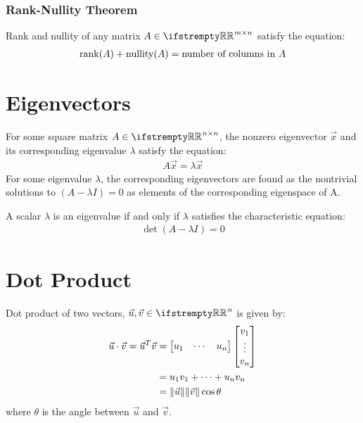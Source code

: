 \documentclass[12pt, a4paper]{article}
\begin{document}
\begin{multicols*}{3}
\subsubsection{Rank-Nullity Theorem}
Rank and nullity of any matrix $A \in \RR^{m{\times}n}$ satisfy the equation:
\begin{align*}
  \operatorname{rank}(A) + \operatorname{nullity}(A) = \text{number of columns in }A
\end{align*}

\colbreak

\section{Eigenvectors}

For some square matrix $A \in \RR^{n{\times}n}$, the nonzero eigenvector $\vec{x}$ and its corresponding eigenvalue $\lambda$ satisfy the equation:
\begin{align*}
  A \vec{x} = \lambda \vec{x}
\end{align*}
For some eigenvalue $\lambda$, the corresponding eigenvectors are found as the nontrivial solutions to $(A - \lambda I) = 0$ as elements of the corresponding eigenspace of A.

A scalar $\lambda$ is an eigenvalue if and only if $\lambda$ satisfies the characteristic equation:
\begin{align*}
  \det(A - \lambda I) = 0
\end{align*}

\section{Dot Product}

Dot product of two vectors, $\vec{u}, \vec{v} \in \RR^n$ is given by:
\begin{align*}
  \vec{u} \cdot \vec{v} = \vec{u}^T \vec{v}
                    &= \begin{bmatrix}u_1 & \cdots & u_n\end{bmatrix} \begin{bmatrix}v_1 \\ \vdots \\ v_n\end{bmatrix}\\
                    &= u_1v_1 + \cdots + u_nv_n \\
                    &= \lVert\vec{u}\rVert\lVert\vec{v}\rVert\cos\theta
\end{align*}
where $\theta$ is the angle between $\vec{u}$ and $\vec{v}$.


\end{multicols*}
\end{document}
